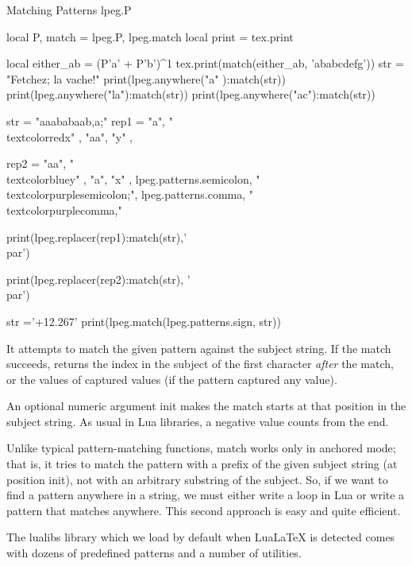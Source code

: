 \begin{texexample}{Matching Patterns lpeg.P}{}
\begin{luacode}
local P, match = lpeg.P, lpeg.match
local print = tex.print
       
local either_ab = (P'a' + P'b')^1
        tex.print(match(either_ab,  'ababcdefg'))
     str = "Fetchez; la vache!"
print(lpeg.anywhere("a" ):match(str))
print(lpeg.anywhere("la"):match(str))
print(lpeg.anywhere("ac"):match(str))  



 str = "aaababaab,a;"
rep1 = {
    { "a",  "\\textcolor{red}{x}" },
    { "aa", "y" },
}

rep2 = {
    { "aa", "\\textcolor{blue}{y}" },
    { "a",  "x" },
    {lpeg.patterns.semicolon, "\\textcolor{purple}{semicolon;}"},
    {lpeg.patterns.comma, "\\textcolor{purple}{comma,}"}
}

print(lpeg.replacer(rep1):match(str),'\\par')

print(lpeg.replacer(rep2):match(str), '\\par') 

str ='+12.267'
print(lpeg.match(lpeg.patterns.sign, str))
\end{luacode}
\end{texexample}


It attempts to match the given pattern against the subject string. If the match succeeds, returns the index in the subject of the first character \emph{after} the match, or the values of captured values (if the pattern captured any value).

An optional numeric argument init makes the match starts at that position in the subject string. As usual in Lua libraries, a negative value counts from the end.

Unlike typical pattern-matching functions, match works only in anchored mode; that is, it tries to match the pattern with a prefix of the given subject string (at position init), not with an arbitrary substring of the subject. So, if we want to find a pattern anywhere in a string, we must either write a loop in Lua or write a pattern that matches anywhere. This second approach is easy and quite efficient.

The lualibs library which we load by default when LuaLaTeX is detected comes with dozens of predefined patterns and a number of utilities.

